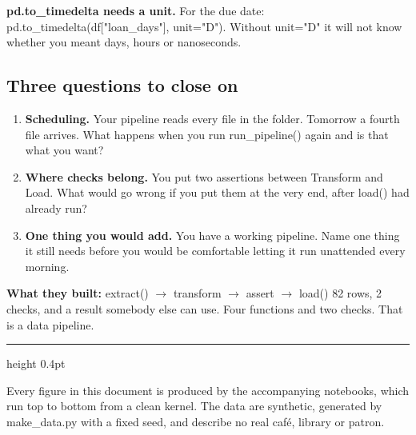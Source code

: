 \documentclass[11pt,letterpaper]{article}
\newcommand{\py}[1]{{\ttfamily\small#1}}
\begin{document}
\begin{trap}
\small
\textbf{\py{pd.to\_timedelta} needs a unit.} For the due date:
\py{pd.to\_timedelta(df["loan\_days"], unit="D")}. Without \py{unit="D"} it will not know whether
you meant days, hours or nanoseconds.
\end{trap}

\subsection*{\sffamily Three questions to close on}

\begin{enumerate}
  \item \textbf{Scheduling.} Your pipeline reads every file in the folder. Tomorrow a fourth file
        arrives. What happens when you run \py{run\_pipeline()} again \textemdash{} and is that what
        you want?
  \item \textbf{Where checks belong.} You put two assertions between Transform and Load. What would
        go wrong if you put them at the very end, after \py{load()} had already run?
  \item \textbf{One thing you would add.} You have a working pipeline. Name one thing it still needs
        before you would be comfortable letting it run unattended every morning.
\end{enumerate}

\vspace{6pt}
\begin{keynote}
\small
\textbf{What they built:}
\py{extract()} \(\rightarrow\) transform \(\rightarrow\) \py{assert} \(\rightarrow\) \py{load()}
\textemdash{} 82 rows, 2 checks, and a result somebody else can use. Four functions and two checks.
That is a data pipeline.
\end{keynote}

\vspace{8pt}
\color{rule}\hrule height 0.4pt\color{ink}
\vspace{4pt}

{\sffamily\footnotesize\color{muted}
Every figure in this document is produced by the accompanying notebooks, which run top to bottom from
a clean kernel. The data are synthetic, generated by \py{make\_data.py} with a fixed seed, and
describe no real caf\'e, library or patron.}
\end{document}
